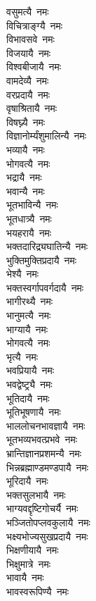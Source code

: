 \begin{multicols}{\maxColumns}
\begin{flushleft}
वसुमत्यै~नमः\hfill{}\\
विचित्राङ्ग्यै~नमः\\
विभावसवे~नमः\\
विजयायै~नमः\\
विश्वबीजायै~नमः\\
वामदेव्यै~नमः\\
वरप्रदायै~नमः\\
वृषाश्रितायै~नमः\\
विषघ्न्यै~नमः\\
विज्ञानोर्म्यंशुमालिन्यै~नमः\\
भव्यायै~नमः\hfill{}\\
भोगवत्यै~नमः\\
भद्रायै~नमः\\
भवान्यै~नमः\\
भूतभाविन्यै~नमः\\
भूतधात्र्यै~नमः\\
भयहरायै~नमः\\
भक्तदारिद्र्यघातिन्यै~नमः\\
भुक्तिमुक्तिप्रदायै~नमः\\
भेश्यै~नमः\\
भक्तस्वर्गापवर्गदायै~नमः\hfill{}\\
भागीरथ्यै~नमः\\
भानुमत्यै~नमः\\
भाग्यायै~नमः\\
भोगवत्यै~नमः\\
भृत्यै~नमः\\
भवप्रियायै~नमः\\
भवद्वेष्ट्र्यै~नमः\\
भूतिदायै~नमः\\
भूतिभूषणायै~नमः\\
भाललोचनभावज्ञायै~नमः\hfill{}\\
भूतभव्यभवत्प्रभवे~नमः\\
भ्रान्तिज्ञानप्रशमन्यै~नमः\\
भिन्नब्रह्माण्डमण्डपायै~नमः\\
भूरिदायै~नमः\\
भक्तसुलभायै~नमः\\
भाग्यवद्दृष्टिगोचर्यै~नमः\\
भञ्जितोपप्लवकुलायै~नमः\\
भक्ष्यभोज्यसुखप्रदायै~नमः\\
भिक्षणीयायै~नमः\\
भिक्षुमात्रे~नमः\hfill{}\\
भावायै~नमः\\
भावस्वरूपिण्यै~नमः\\

\end{flushleft}
\end{multicols}

